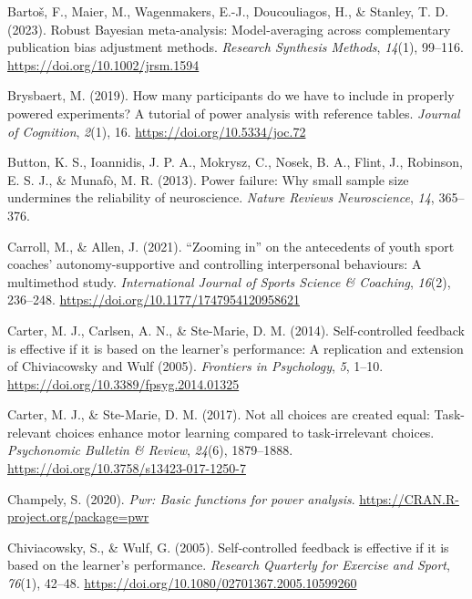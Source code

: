 \documentclass[
  doc, donotrepeattitle,floatsintext]{apa7}
\newlength{\cslhangindent}
\newlength{\cslentryspacingunit} %
\newenvironment{CSLReferences}[2] %
 {%
  \setlength{\parindent}{0pt}
  \ifodd #1
  \let\oldpar\par
  \def\par{\hangindent=\cslhangindent\oldpar}
  \fi
  \setlength{\parskip}{#2\cslentryspacingunit}
 }%
 {}
\begin{document}
\begin{CSLReferences}{1}{0}
\leavevmode{}%
Bartoš, F., Maier, M., Wagenmakers, E.-J., Doucouliagos, H., \& Stanley, T. D. (2023). Robust {Bayesian} meta-analysis: {Model}-averaging across complementary publication bias adjustment methods. \emph{Research Synthesis Methods}, \emph{14}(1), 99--116. \url{https://doi.org/10.1002/jrsm.1594}

\leavevmode{}%
Brysbaert, M. (2019). How many participants do we have to include in properly powered experiments? {A} tutorial of power analysis with reference tables. \emph{Journal of Cognition}, \emph{2}(1), 16. \url{https://doi.org/10.5334/joc.72}

\leavevmode{}%
Button, K. S., Ioannidis, J. P. A., Mokrysz, C., Nosek, B. A., Flint, J., Robinson, E. S. J., \& Munafò, M. R. (2013). Power failure: {Why} small sample size undermines the reliability of neuroscience. \emph{Nature Reviews Neuroscience}, \emph{14}, 365--376.

\leavevmode{}%
Carroll, M., \& Allen, J. (2021). {``{Zooming} in''} on the antecedents of youth sport coaches' autonomy-supportive and controlling interpersonal behaviours: A multimethod study. \emph{International Journal of Sports Science \& Coaching}, \emph{16}(2), 236--248. \url{https://doi.org/10.1177/1747954120958621}

\leavevmode{}%
Carter, M. J., Carlsen, A. N., \& Ste-Marie, D. M. (2014). Self-controlled feedback is effective if it is based on the learner's performance: {A} replication and extension of {Chiviacowsky} and {Wulf} (2005). \emph{Frontiers in Psychology}, \emph{5}, 1--10. \url{https://doi.org/10.3389/fpsyg.2014.01325}

\leavevmode{}%
Carter, M. J., \& Ste-Marie, D. M. (2017). Not all choices are created equal: {Task-relevant} choices enhance motor learning compared to task-irrelevant choices. \emph{Psychonomic Bulletin \& Review}, \emph{24}(6), 1879--1888. \url{https://doi.org/10.3758/s13423-017-1250-7}

\leavevmode{}%
Champely, S. (2020). \emph{Pwr: Basic functions for power analysis}. \url{https://CRAN.R-project.org/package=pwr}

\leavevmode{}%
Chiviacowsky, S., \& Wulf, G. (2005). Self-controlled feedback is effective if it is based on the learner's performance. \emph{Research Quarterly for Exercise and Sport}, \emph{76}(1), 42--48. \url{https://doi.org/10.1080/02701367.2005.10599260}


\end{CSLReferences}
\end{document}
